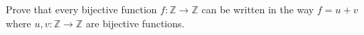 Prove that every bijective function $ f: \mathbb{Z}\to\mathbb{Z}$ can be written in the way $ f=u+v$ where $ u,v: \mathbb{Z}\to\mathbb{Z}$ are bijective functions.
